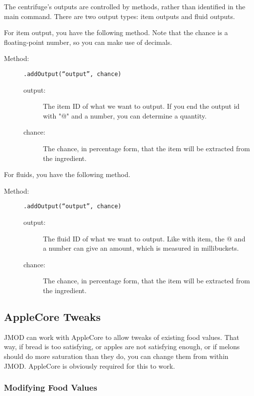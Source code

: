 \documentclass[letterpaper,titlepage,12pt]{article}
\begin{document}
The centrifuge's outputs are controlled by methods, rather than identified in the main command.  There are two output types: item outputs and fluid outputs.

For item output, you have the following method.  Note that the chance is a floating-point number, so you can make use of decimals.

\begin{description}
\item[Method:] \texttt{.addOutput(``output'', chance)}
\begin{description}
\item [output:] The item ID of what we want to output.  If you end the output id with "@" and a number, you can determine a quantity.
\item [chance:] The chance, in percentage form, that the item will be extracted from the ingredient.
\end{description}
\end{description}

For fluids, you have the following method.  

\begin{description}
\item[Method:] \texttt{.addOutput(``output'', chance)}
\begin{description}
\item [output:] The fluid ID of what we want to output.  Like with item, the @ and a number can give an amount, which is measured in millibuckets.
\item [chance:] The chance, in percentage form, that the item will be extracted from the ingredient.
\end{description}
\end{description}

\subsection{AppleCore Tweaks}

JMOD can work with AppleCore to allow tweaks of existing food values.  That way, if bread is too satisfying, or apples are not satisfying enough, or if melons should do more saturation than they do, you can change them from within JMOD.  AppleCore is obviously required for this to work.

\subsubsection{Modifying Food Values}
\end{document}
